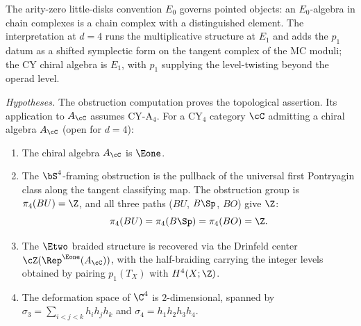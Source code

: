 \begin{remark}
\label{rem:e0-nonexistence}
The arity-zero little-disks convention $E_0$ governs pointed objects:
an $E_0$-algebra in chain complexes is a chain complex with a
distinguished element. The interpretation at $d = 4$ runs the
multiplicative structure at $E_1$ and adds the $p_1$ datum as a
shifted symplectic form on the tangent complex of the MC moduli; the
CY chiral algebra is $E_1$, with $p_1$ supplying the level-twisting
beyond the operad level.
\end{remark}


\begin{corollary}[\texorpdfstring{$d = 4$}{d = 4}: the first Pontryagin obstruction]
\label{cor:d4-pontryagin}
\noindent\emph{Hypotheses.} The obstruction computation proves the topological assertion. Its application to $A_\cC$ assumes CY-A$_4$.
For a CY$_4$ category $\cC$ admitting a chiral algebra $A_\cC$ (open for $d = 4$):
\begin{enumerate}[label=\textup{(\roman*)}]
 \item The chiral algebra $A_\cC$ is $\Eone$.
 \item The $\bS^4$-framing obstruction is the pullback of the universal first Pontryagin class along the tangent classifying map. The obstruction group is \(\pi_4(BU)=\Z\), and all three paths ($BU$, $B\Sp$, $BO$) give $\Z$:
 \[
 \pi_4(BU) = \pi_4(B\Sp) = \pi_4(BO) = \Z.
 \]
 \item The $\Etwo$ braided structure is recovered via the Drinfeld center $\cZ(\Rep^{\Eone}(A_\cC))$, with the half-braiding carrying the integer levels obtained by pairing \(p_1(T_X)\) with \(H^4(X;\Z)\).
 \item The deformation space of $\C^4$ is $2$-dimensional, spanned by $\sigma_3 = \sum_{i<j<k} h_i h_j h_k$ and $\sigma_4 = h_1 h_2 h_3 h_4$.
\end{enumerate}
\end{corollary}

